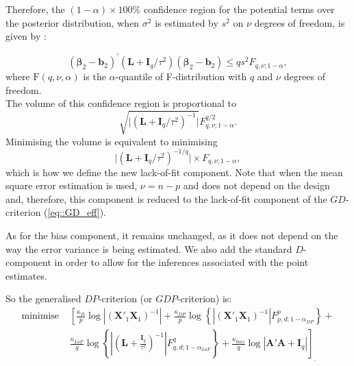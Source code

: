 Therefore, the $(1-\alpha)\times100\%$ confidence region for the potential terms over the posterior distribution, when $\sigma^2$ is estimated by $s^2$ on $\nu$ degrees of freedom, is given by \citep{Draper1998}:

$$(\bm{\beta}_{2}-\bm{b}_{2})^{'}(\bm{L}+\bm{I}_{q}/\tau^{2})(\bm{\beta}_{2}-\bm{b}_{2})\leq qs^{2}F_{q,\nu;1-\alpha},$$
where $\mathrm{F}(q,\nu,\alpha)$ is the $\alpha$-quantile of F-distribution with $q$ and $\nu$ degrees of freedom.\\ 
The volume of this confidence region is proportional to
\begin{equation*}
\sqrt{\vert(\bm{L}+\bm{I}_{q}/\tau^{2})^{-1}\vert}F^{q/2}_{q,\nu;1-\alpha}.
\end{equation*}
Minimising the volume is equivalent to minimising
\begin{equation*}
\vert(\bm{L}+\bm{I}_{q}/\tau^{2})^{-1/q}\vert\times F_{q,\nu;1-\alpha},
\end{equation*}
which is how we define the new lack-of-fit component. Note that when the mean square error estimation is used, $\nu=n-p$ and does not depend on the design and, therefore, this component is reduced to the lack-of-fit component of the $GD$-criterion (\ref{eq::GD_eff}). 

As for the bias component, it remains unchanged, as it does not depend on the way the error variance is being estimated. We also add the standard $D$-component in order to allow for the inferences associated with the point estimates.

So the generalised $DP$-criterion (or $GDP$-criterion) is:
\begin{align*}
\mbox{minimise }&\left[\frac{\kappa_{D}}{p}\log|(\bm{X}'_{1}\bm{X}_{1})^{-1}|+\frac{\kappa_{DP}}{p}\log\left\{|(\bm{X}'_{1}\bm{X}_{1})^{-1}|F^{p}_{p,d;1-\alpha_{DP}}\right\} + \right.\\ &\left.\frac{\kappa_{LoF}}{q}\log\left\{\left|\left(\bm{L}+\frac{\bm{I}_{q}}{\tau^{2}}\right)^{-1}\right|F^{q}_{q,d;1-\alpha_{LoF}}\right\}+\frac{\kappa_{bias}}{q}\log|\bm{A}'\bm{A}+\bm{I}_{q}|\right]_{.} 
\end{align*}

